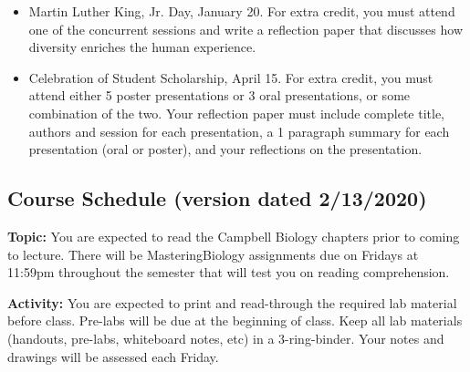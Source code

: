 \documentclass{tufte-handout}
\begin{document}
\begin{fullwidth}
\begin{itemize}
\item Martin Luther King, Jr. Day, January 20. For extra credit, you must attend one of the concurrent sessions and write a reflection paper that discusses how diversity enriches the human experience. 
\item Celebration of Student Scholarship, April 15.  For extra credit, you must attend either 5 poster presentations or 3 oral presentations, or some combination of the two.  Your reflection paper must include complete title, authors and session for each presentation, a 1 paragraph summary for each presentation (oral or poster), and your reflections on the presentation.  	
\end{itemize}









\newpage
\subsection{Course Schedule (version dated 2/13/2020)}
%

\textbf{Topic:} You are expected to read the Campbell Biology chapters prior to coming to lecture.  There will be MasteringBiology assignments due on Fridays at 11:59pm throughout the semester that will test you on reading comprehension. 

\textbf{Activity:} You are expected to print and read-through the required lab material before class. Pre-labs will be due at the beginning of class. Keep all lab materials (handouts, pre-labs, whiteboard notes, etc) in a 3-ring-binder. Your notes and drawings will be assessed each Friday.


\end{fullwidth}
\end{document}
